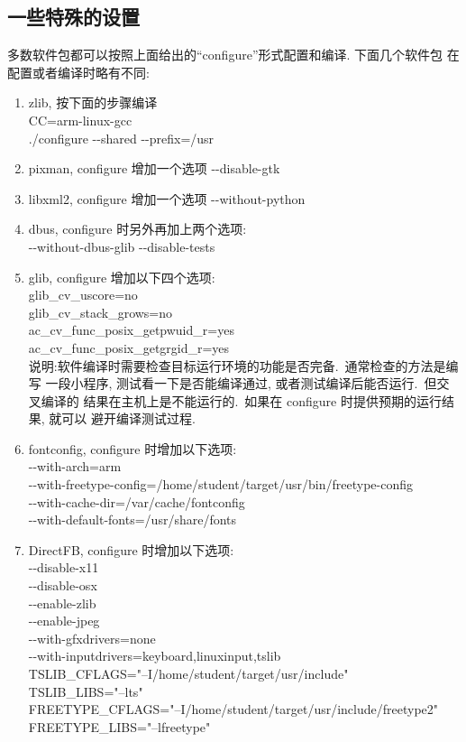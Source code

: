 \subsection{一些特殊的设置}
    多数软件包都可以按照上面给出的``configure''形式配置和编译. 下面几个软件包
在配置或者编译时略有不同:
\begin{enumerate}
  \item zlib, 按下面的步骤编译\\
      CC=arm-linux-gcc\\
      ./configure -{}-shared -{}-prefix=/usr

  \item pixman, configure 增加一个选项 -{}-disable-gtk

  \item libxml2, configure 增加一个选项 -{}-without-python

  \item dbus,  configure 时另外再加上两个选项:\\
      -{}-without-dbus-glib  -{}-disable-tests

  \item glib, configure 增加以下四个选项:\\
          glib\_cv\_uscore=no\\
          glib\_cv\_stack\_grows=no\\
          ac\_cv\_func\_posix\_getpwuid\_r=yes \\
          ac\_cv\_func\_posix\_getgrgid\_r=yes\\
    说明:软件编译时需要检查目标运行环境的功能是否完备.~通常检查的方法是编写
    一段小程序, 测试看一下是否能编译通过, 或者测试编译后能否运行.~但交叉编译的
    结果在主机上是不能运行的.~如果在 configure 时提供预期的运行结果, 就可以
    避开编译测试过程.

  \item fontconfig, configure 时增加以下选项:\\
      -{}-with-arch=arm \\
      -{}-with-freetype-config=/home/student/target/usr/bin/freetype-config \\
      -{}-with-cache-dir=/var/cache/fontconfig \\
      -{}-with-default-fonts=/usr/share/fonts

  \item DirectFB, configure 时增加以下选项:\\
      -{}-disable-x11 \\
      -{}-disable-osx \\
      -{}-enable-zlib \\
      -{}-enable-jpeg \\
      -{}-with-gfxdrivers=none \\
      -{}-with-inputdrivers=keyboard,linuxinput,tslib \\
      TSLIB\_CFLAGS="--I/home/student/target/usr/include" \\
      TSLIB\_LIBS="--lts" \\
      FREETYPE\_CFLAGS="--I/home/student/target/usr/include/freetype2" \\
      FREETYPE\_LIBS="--lfreetype"


\end{enumerate}
